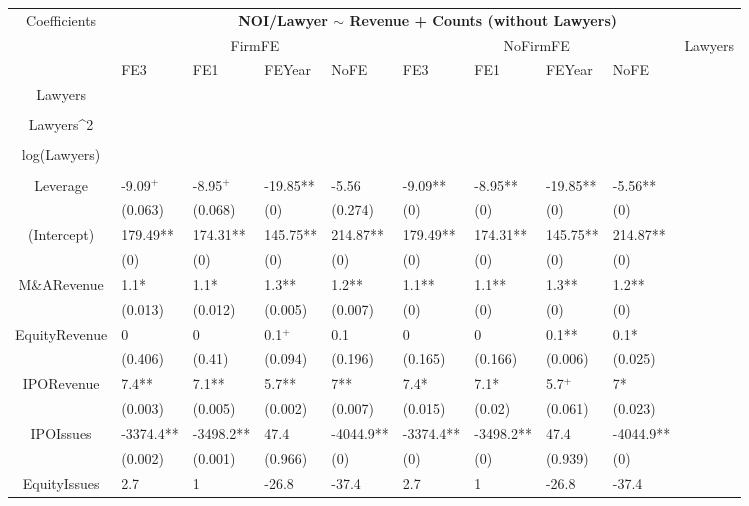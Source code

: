 \documentclass{article}
\begin{document}
\begin{table}[H]
\centering
\begin{tabular}{|clllllllll|}
\hline
\multirow{3}{*}{Coefficients} & \multicolumn{9}{c|}{\textbf{NOI/Lawyer $\sim$ Revenue + Counts (without Lawyers)}} \\
\cline{2-10}
& \multicolumn{4}{c}{FirmFE} & \multicolumn{4}{c}{NoFirmFE} & \multirow{2}{*}{Lawyers} \\
\cline{2-9}
& FE3 & FE1 & FEYear & NoFE & FE3 & FE1 & FEYear & NoFE &  \\
\hline
 
Lawyers &  &  &  &  &  &  &  &  & \\ 
   &  &  &  &  &  &  &  &  & \\ 
  Lawyers^2 &  &  &  &  &  &  &  &  & \\ 
   &  &  &  &  &  &  &  &  & \\ 
  log(Lawyers) &  &  &  &  &  &  &  &  & \\ 
   &  &  &  &  &  &  &  &  & \\ 
  Leverage & -9.09$^{+}$ & -8.95$^{+}$ & -19.85** & -5.56 & -9.09** & -8.95** & -19.85** & -5.56** & \\ 
   & (0.063) & (0.068) & (0) & (0.274) & (0) & (0) & (0) & (0) & \\ 
  (Intercept) & 179.49** & 174.31** & 145.75** & 214.87** & 179.49** & 174.31** & 145.75** & 214.87** & \\ 
   & (0) & (0) & (0) & (0) & (0) & (0) & (0) & (0) & \\ 
  M\&ARevenue & 1.1* & 1.1* & 1.3** & 1.2** & 1.1** & 1.1** & 1.3** & 1.2** & \\ 
   & (0.013) & (0.012) & (0.005) & (0.007) & (0) & (0) & (0) & (0) & \\ 
  EquityRevenue & 0 & 0 & 0.1$^{+}$ & 0.1 & 0 & 0 & 0.1** & 0.1* & \\ 
   & (0.406) & (0.41) & (0.094) & (0.196) & (0.165) & (0.166) & (0.006) & (0.025) & \\ 
  IPORevenue & 7.4** & 7.1** & 5.7** & 7** & 7.4* & 7.1* & 5.7$^{+}$ & 7* & \\ 
   & (0.003) & (0.005) & (0.002) & (0.007) & (0.015) & (0.02) & (0.061) & (0.023) & \\ 
  IPOIssues & -3374.4** & -3498.2** & 47.4 & -4044.9** & -3374.4** & -3498.2** & 47.4 & -4044.9** & \\ 
   & (0.002) & (0.001) & (0.966) & (0) & (0) & (0) & (0.939) & (0) & \\ 
  EquityIssues & 2.7 & 1 & -26.8 & -37.4 & 2.7 & 1 & -26.8 & -37.4 & \\ 

\end{tabular}
\end{table}
\end{document}
